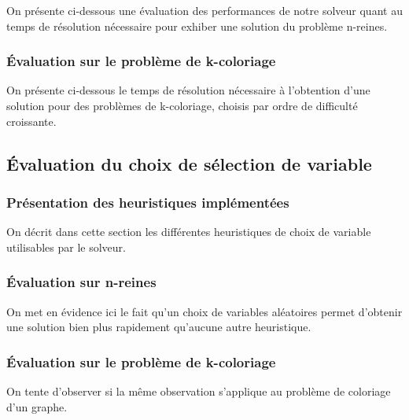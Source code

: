 \documentclass[14pt]{article}
\begin{document}
On présente ci-dessous une évaluation des performances de notre solveur quant au temps de résolution nécessaire pour exhiber une solution du problème n-reines.

\subsubsection{Évaluation sur le problème de k-coloriage}

On présente ci-dessous le temps de résolution nécessaire à l'obtention d'une solution pour des problèmes de k-coloriage, choisis par ordre de difficulté croissante.

\subsection{Évaluation du choix de sélection de variable}

\subsubsection{Présentation des heuristiques implémentées}

On décrit dans cette section les différentes heuristiques de choix de variable utilisables par le solveur.

\subsubsection{Évaluation sur n-reines}

On met en évidence ici le fait qu'un choix de variables aléatoires permet d'obtenir une solution bien plus rapidement qu'aucune autre heuristique.

\subsubsection{Évaluation sur le problème de k-coloriage}

On tente d'observer si la même observation s'applique au problème de coloriage d'un graphe.

\end{document}
